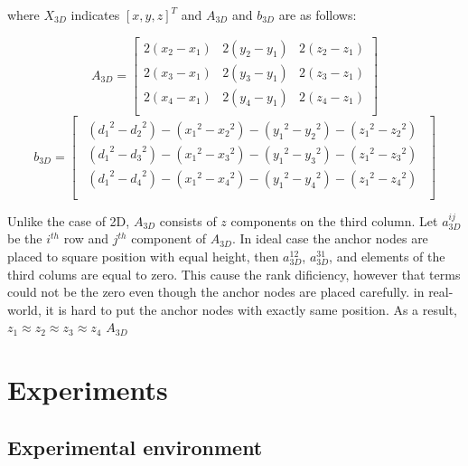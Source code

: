 \documentclass{ieeeaccess}
\begin{document}
where $X_{3D}$ indicates $[x,y,z]^T$ and $A_{3D}$ and $b_{3D}$ are as follows: 

\begin{equation}
A_{3D} =\left[ {\begin{array}{ccc}
	2(x_2-x_1) & 2(y_2-y_1) & 2(z_2-z_1)\\
	2(x_3-x_1) & 2(y_3-y_1) & 2(z_3-z_1)\\
	2(x_4-x_1) & 2(y_4-y_1) & 2(z_4-z_1)\\
	\end{array} } \right]
\end{equation}
\begin{equation}
b_{3D} = \left[ {\begin{array}{c}
	\substack{
		({d_1}^2-{d_2}^2)-({x_1}^2-{x_2}^2)-({y_1}^2-{y_2}^2)-({z_1}^2-{z_2}^2)\\
		({d_1}^2-{d_3}^2)-({x_1}^2-{x_3}^2)-({y_1}^2-{y_3}^2)-({z_1}^2-{z_3}^2)\\
		({d_1}^2-{d_4}^2)-({x_1}^2-{x_4}^2)-({y_1}^2-{y_4}^2)-({z_1}^2-{z_4}^2)\\
	}
	\end{array} } \right]
\end{equation}

Unlike the case of 2D, $A_{3D}$ consists of $z$ components on the third column. Let $a_{3D}^{ij}$ be the $i^{th}$ row and $j^{th}$ component of $A_{3D}$. In ideal case the anchor nodes are placed to square position with equal height, then $a_{3D}^{12}$, $a_{3D}^{31}$, and elements of the third colums are equal to zero. This cause the rank dificiency, however that terms could not be the zero even though the anchor nodes are placed carefully. in real-world, it is hard to put the anchor nodes with exactly same position. As a result, $z_1\approx z_2\approx z_3\approx z_4$ $A_{3D}$  



\section{Experiments}
\subsection{Experimental environment}
\end{document}
